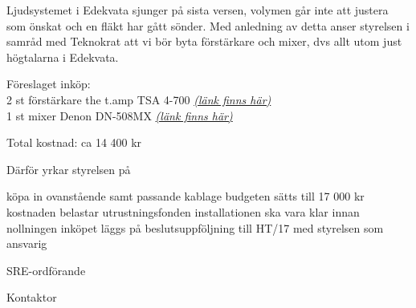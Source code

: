 \documentclass[../_main/handlingar.tex]{subfiles}
\def\sreordf{Pontus Landgren}
\begin{document}
Ljudsystemet i Edekvata sjunger på sista versen, volymen går inte att justera som önskat och en fläkt har gått sönder. Med anledning av detta anser styrelsen i samråd med Teknokrat att vi bör byta förstärkare och mixer, dvs allt utom just högtalarna i Edekvata.  

Föreslaget inköp:\\ 
2 st förstärkare the t.amp TSA 4-700 \href{https://www.thomann.de/se/the_tamp_tsa_4700.htm}{\textit{(länk finns här)}}\\
1 st mixer Denon DN-508MX \href{https://www.thomann.de/se/denon_dn_508mx.htm}{\textit{(länk finns här)}}

Total kostnad: ca 14 400 kr

Därför yrkar styrelsen på

\begin{attsatser}
    \att köpa in ovanstående samt passande kablage
    \att budgeten sätts till 17 000 kr 
    \att kostnaden belastar utrustningsfonden
    \att installationen ska vara klar innan nollningen
    \att inköpet läggs på beslutsuppföljning till HT/17 med styrelsen som ansvarig 
    
\end{attsatser}

\begin{signatures}{2}
    \ist
    \signature{\sreordf}{SRE-ordförande}
    \signature{Johan Karlberg}{Kontaktor}
\end{signatures}
\end{document}
